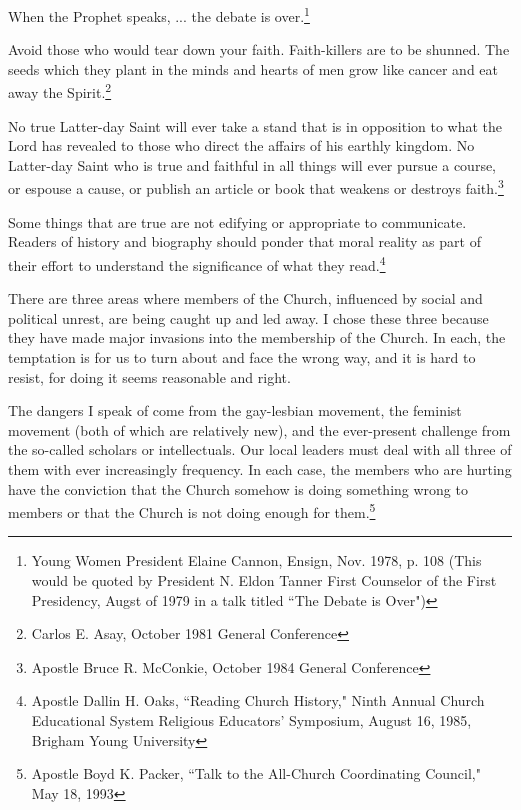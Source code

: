 \begin{displayquote}
When the Prophet speaks, ... the debate is over.\footnote{Young Women President Elaine 
Cannon, Ensign, Nov. 1978, p. 108 (This would be quoted by President N. Eldon Tanner
  First Counselor of the First Presidency, Augst of 1979 in a talk titled ``The 
  Debate is Over")}
\end{displayquote}

\begin{displayquote}
Avoid those who would tear down your faith. Faith-killers are to be shunned. The
seeds which they plant in the minds and hearts of men grow like cancer and eat
away the Spirit.\footnote{Carlos E. Asay, October 1981 General Conference}
\end{displayquote}

\begin{displayquote}
No true Latter-day Saint will ever take a stand that is in opposition to what the 
Lord has revealed to those who direct the affairs of his earthly kingdom. No 
Latter-day Saint who is true and faithful in all things will ever pursue a course, 
or espouse a cause, or publish an article or book that weakens or destroys 
faith.\footnote{Apostle Bruce R. McConkie, October 1984 General Conference}
\end{displayquote}

\begin{displayquote}
Some things that are true are not edifying or appropriate to communicate. Readers 
of history and biography should ponder that moral reality as part of their effort to 
understand the significance of what they read.\footnote{Apostle Dallin H. Oaks, 
``Reading Church History," Ninth Annual Church Educational System Religious 
Educators' Symposium, August 16, 1985, Brigham Young University}
\end{displayquote}

\begin{displayquote}
There are three areas where members of the Church, influenced by social and political
unrest, are being caught up and led away. I chose these three because they have made
major invasions into the membership of the Church. In each, the temptation is for us
to turn about and face the wrong way, and it is hard to resist, for doing it seems
reasonable and right.

The dangers I speak of come from the gay-lesbian movement, the feminist movement
(both of which are relatively new), and the ever-present challenge from the so-called
scholars or intellectuals. Our local leaders must deal with all three of them with
ever increasingly frequency. In each case, the members who are hurting have the
conviction that the Church somehow is doing something wrong to members or that the
Church is not doing enough for them.\footnote{Apostle Boyd K. Packer, 
``Talk to the All-Church Coordinating Council," May 18, 1993}
\end{displayquote}

